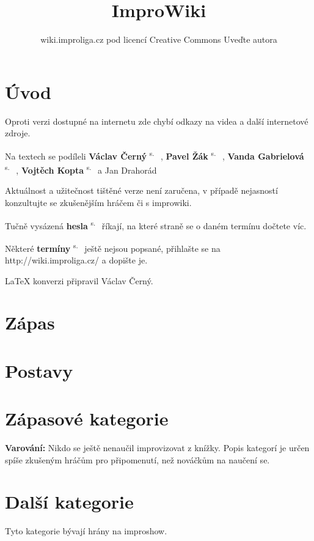 \documentclass[a4paper,8pt,openany]{memoir}
\title{ImproWiki}
\author{wiki.improliga.cz pod licencí Creative Commons Uveďte autora}
\newcommand{\odkaz}[2]{
\textbf{#1}
\textsuperscript{s.~\pageref{#2}}
}
\begin{document}
\begin{titlepage}
\maketitle
\end{titlepage}
 
\chapter{Úvod}\label{úvod}

 

Oproti verzi dostupné na internetu zde chybí odkazy na videa a další internetové zdroje.

Na textech se podíleli \odkaz{Václav Černý}{uživatel:vatoz}, \odkaz{Pavel Žák}{uživatel:just-paja}, \odkaz{Vanda Gabrielová}{uživatel:vandagabi}, \odkaz{Vojtěch Kopta}{uživatel:vojtechkopta} a Jan Drahorád

Aktuálnost a užitečnost tištěné verze není zaručena, v případě nejasností konzultujte se zkušenějším hráčem či s improwiki.

Tučně vysázená \odkaz{hesla}{úvod} říkají, na které straně se o daném termínu dočtete víc.

Některé \odkaz{termíny}{odkaz nikam nevede} ještě nejsou popsané, přihlašte se na http://wiki.improliga.cz/ a dopište je.

\LaTeX{} konverzi připravil  Václav Černý. 
\chapter{Zápas}


\chapter{Postavy}



\chapter{Zápasové kategorie}\label{zápasové kategorie}\label{kategorie}

\textbf{Varování:} Nikdo se ještě nenaučil improvizovat z knížky. Popis kategorí je určen spíše zkušeným hráčům pro připomenutí, než nováčkům na naučení se.  


\chapter{Další kategorie}\label{další kategorie}
Tyto kategorie bývají hrány na improshow.

\end{document}
